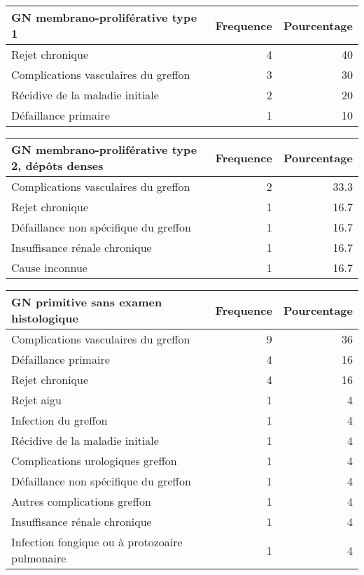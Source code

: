 \documentclass[11pt,a4paper]{article}\usepackage[]{graphicx}\usepackage[]{color}
\begin{document}
\begin{table}[H]
\centering
\begin{tabular}{lrr}
  \hline
GN membrano-proliférative type 1 & Frequence & Pourcentage \\ 
  \hline
Rejet chronique & 4 & 40 \\ 
  Complications vasculaires du greffon & 3 & 30 \\ 
  Récidive de la maladie initiale & 2 & 20 \\ 
  Défaillance primaire & 1 & 10 \\ 
   \hline
\end{tabular}
\end{table}
\begin{table}[H]
\centering
\begin{tabular}{lrr}
  \hline
GN membrano-proliférative type 2, dépôts denses & Frequence & Pourcentage \\ 
  \hline
Complications vasculaires du greffon & 2 & 33.3 \\ 
  Rejet chronique & 1 & 16.7 \\ 
  Défaillance non spécifique du greffon & 1 & 16.7 \\ 
  Insuffisance rénale chronique & 1 & 16.7 \\ 
  Cause inconnue & 1 & 16.7 \\ 
   \hline
\end{tabular}
\end{table}
\begin{table}[H]
\centering
\begin{tabular}{lrr}
  \hline
GN primitive sans examen histologique & Frequence & Pourcentage \\ 
  \hline
Complications vasculaires du greffon & 9 & 36 \\ 
  Défaillance primaire & 4 & 16 \\ 
  Rejet chronique & 4 & 16 \\ 
  Rejet aigu & 1 & 4 \\ 
  Infection du greffon & 1 & 4 \\ 
  Récidive de la maladie initiale & 1 & 4 \\ 
  Complications urologiques greffon & 1 & 4 \\ 
  Défaillance non spécifique du greffon & 1 & 4 \\ 
  Autres complications greffon & 1 & 4 \\ 
  Insuffisance rénale chronique & 1 & 4 \\ 
  Infection fongique ou à protozoaire pulmonaire & 1 & 4 \\ 
   \hline
\end{tabular}
\end{table}
\end{document}
